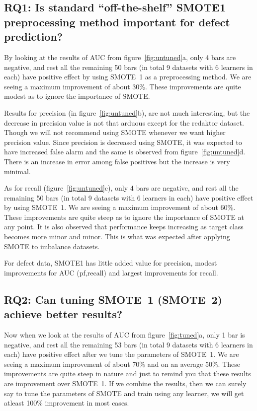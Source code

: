 \subsection{\textbf{RQ1: Is standard ``off-the-shelf'' SMOTE1 preprocessing method important for defect prediction?}}

By looking at the results of AUC from figure~\ref{fig:untuned}a, only 4 bars are negative, and rest all the remaining 50 bars (in total 9 datasets with 6 learners in each) have  positive effect by using SMOTE~1 as a preprocessing method. We are seeing a maximum improvement of about 30\%. These improvements are quite modest as to ignore the importance of SMOTE.

Results for precision (in figure~\ref{fig:untuned}b), are not much interesting, but the decrease in precision value is not that arduous except for the redaktor dataset. Though we will not recommend using SMOTE whenever we want higher precision value. Since precision is decreased using SMOTE, it was expected to have increased false alarm \cite{menzies2007problems} and the same is observed from figure~\ref{fig:untuned}d. There is an increase in error among false positives but the increase is very minimal.

As for recall (figure~\ref{fig:untuned}c), only 4 bars are negative, and rest all the remaining 50 bars (in total 9 datasets with 6 learners in each) have positive effect by using SMOTE~1. We are seeing a maximum improvement of about 60\%. These improvements are quite steep as to ignore the importance of SMOTE at any point. It is also observed that performance keeps increasing as target class becomes more minor and minor. This is what was expected after applying SMOTE to imbalance datasets.

\begin{lesson}
    For defect data, SMOTE1 has little added value for 
 precision, modest improvements for AUC (pf,recall) and largest improvements for recall.
\end{lesson}

\subsection{\textbf{RQ2: Can tuning SMOTE~1 (SMOTE~2) achieve better results?}}

Now when we look at the results of AUC from figure~\ref{fig:tuned}a, only 1 bar is negative, and rest all the remaining 53 bars (in total 9 datasets with 6 learners in each) have  positive effect after we tune the parameters of SMOTE~1. We are seeing a maximum improvement of about 70\% and on an average 50\%. These improvements are quite steep in nature and just to remind you that these results are improvement over SMOTE~1. If we combine the results, then we can surely say to tune the parameters of SMOTE and train using any learner, we will get atleast 100\% improvement in most cases.

